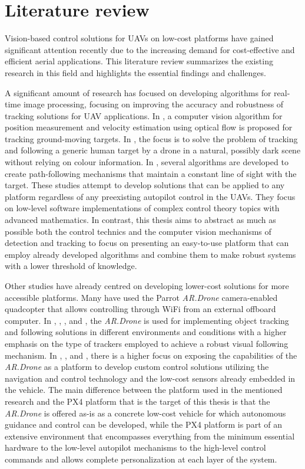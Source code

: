 \section{Literature review}
\label{sec:lit-review}

Vision-based control solutions for UAVs on low-cost platforms have gained significant attention recently due to the increasing demand for cost-effective and efficient aerial applications. This literature review summarizes the existing research in this field and highlights the essential findings and challenges.

A significant amount of research has focused on developing algorithms for real-time image processing, focusing on improving the accuracy and robustness of tracking solutions for UAV applications.
In \cite{gomez-balderas2012}, a computer
vision algorithm for position measurement and velocity estimation using optical flow is proposed for tracking ground-moving targets.
In \cite{bevilacqua2016}, the focus is to solve the problem of tracking and following a generic human target by a drone in a natural, possibly dark scene without relying on colour information.
In \cite{rysdyk2003}, several algorithms are developed to create path-following mechanisms that maintain a constant line of sight with the target.
These studies attempt to develop solutions that can be applied to any platform regardless of any preexisting autopilot control in the UAVs.
They focus on low-level software implementations of complex control theory topics with advanced mathematics.
In contrast, this thesis aims to abstract as much as possible both the control technics and the computer vision mechanisms of detection and tracking to focus on presenting an easy-to-use platform that can employ already developed algorithms and combine them to make robust systems with a lower threshold of knowledge.

Other studies have already centred on developing lower-cost solutions for more accessible platforms. Many have used the Parrot \emph{AR.Drone} camera-enabled quadcopter that allows controlling through WiFi from an external offboard computer.
In \cite{bartak2015}, \cite{chakrabarty2016}, \cite{pestana2013}, and \cite{haag2015}, the \emph{AR.Drone} is used for implementing object tracking and following solutions in different environments and conditions with a higher emphasis on the type of trackers employed to achieve a robust visual following mechanism.
In \cite{hernandez2013}, \cite{lugo2014}, and \cite{bristeau2011}, there is a higher focus on exposing the capabilities of the \emph{AR.Drone} as a platform to develop custom control solutions utilizing the navigation and control technology and the low-cost sensors already embedded in the vehicle.
The main difference between the platform used in the mentioned research and the PX4 platform that is the target of this thesis is that the \emph{AR.Drone} is offered as-is as a concrete low-cost vehicle for which autonomous guidance and control can be developed, while the PX4 platform is part of an extensive environment that encompasses everything from the minimum essential hardware to the low-level autopilot mechanisms to the high-level control commands and allows complete personalization at each layer of the system.

